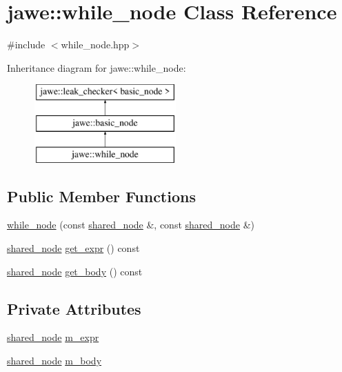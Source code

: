 \hypertarget{classjawe_1_1while__node}{}\section{jawe\+:\+:while\+\_\+node Class Reference}
\label{classjawe_1_1while__node}


{\ttfamily \#include $<$while\+\_\+node.\+hpp$>$}

Inheritance diagram for jawe\+:\+:while\+\_\+node\+:\begin{figure}[H]
\begin{center}
\leavevmode
\includegraphics[height=3.000000cm]{classjawe_1_1while__node}
\end{center}
\end{figure}
\subsection*{Public Member Functions}
\begin{DoxyCompactItemize}
\item 
\hyperlink{classjawe_1_1while__node_ac3972090bfa9d2a8dbe288e2f32a3e8c}{while\+\_\+node} (const \hyperlink{namespacejawe_a3f307481d921b6cbb50cc8511fc2b544}{shared\+\_\+node} \&, const \hyperlink{namespacejawe_a3f307481d921b6cbb50cc8511fc2b544}{shared\+\_\+node} \&)
\item 
\hyperlink{namespacejawe_a3f307481d921b6cbb50cc8511fc2b544}{shared\+\_\+node} \hyperlink{classjawe_1_1while__node_abc4f85cf974d2bec81c4390beb841424}{get\+\_\+expr} () const
\item 
\hyperlink{namespacejawe_a3f307481d921b6cbb50cc8511fc2b544}{shared\+\_\+node} \hyperlink{classjawe_1_1while__node_aa68f947d943b9495df133825c40430cd}{get\+\_\+body} () const
\end{DoxyCompactItemize}
\subsection*{Private Attributes}
\begin{DoxyCompactItemize}
\item 
\hyperlink{namespacejawe_a3f307481d921b6cbb50cc8511fc2b544}{shared\+\_\+node} \hyperlink{classjawe_1_1while__node_a4be0429acc012ec0afd91722b3a902f1}{m\+\_\+expr}
\item 
\hyperlink{namespacejawe_a3f307481d921b6cbb50cc8511fc2b544}{shared\+\_\+node} \hyperlink{classjawe_1_1while__node_a3590c1ed4ea3ec0ec1fea586b6528774}{m\+\_\+body}
\end{DoxyCompactItemize}

